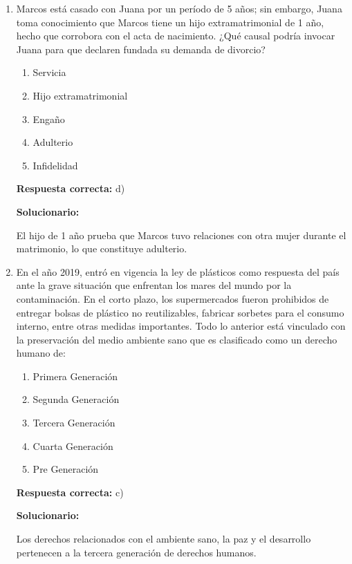 \begin{enumerate}[resume]
	
	\item Marcos está casado con Juana por un período de 5 años; sin embargo, Juana toma conocimiento que Marcos tiene un hijo extramatrimonial de 1 año, hecho que corrobora con el acta de nacimiento. ¿Qué causal podría invocar Juana para que declaren fundada su demanda de divorcio?
	\begin{enumerate}[label=\alph*)]
		\item Servicia
		\item Hijo extramatrimonial
		\item Engaño
		\item Adulterio
		\item Infidelidad
	\end{enumerate}
	\textbf{Respuesta correcta:} d)
	
	\vspace{2mm}
	\textbf{Solucionario:}
	
	El hijo de 1 año prueba que Marcos tuvo relaciones con otra mujer durante el matrimonio, lo que constituye adulterio.
	
	\vspace{6mm}
	
	\item En el año 2019, entró en vigencia la ley de plásticos como respuesta del país ante la grave situación que enfrentan los mares del mundo por la contaminación. En el corto plazo, los supermercados fueron prohibidos de entregar bolsas de plástico no reutilizables, fabricar sorbetes para el consumo interno, entre otras medidas importantes. Todo lo anterior está vinculado con la preservación del medio ambiente sano que es clasificado como un derecho humano de:
	\begin{enumerate}[label=\alph*)]
		\item Primera Generación
		\item Segunda Generación
		\item Tercera Generación
		\item Cuarta Generación
		\item Pre Generación
	\end{enumerate}
	\textbf{Respuesta correcta:} c)
	
	\vspace{2mm}
	\textbf{Solucionario:}
	
	Los derechos relacionados con el ambiente sano, la paz y el desarrollo pertenecen a la tercera generación de derechos humanos.
	
	\vspace{6mm}
	
\end{enumerate}

